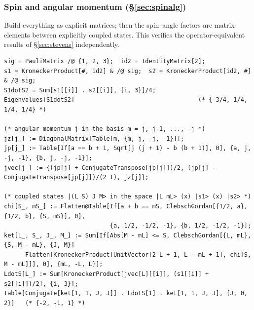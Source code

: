 \documentclass[11pt,a4paper]{article}
\numberwithin{equation}{section}
\theoremstyle{definition}
\theoremstyle{plain}
\theoremstyle{remark}
\numberwithin{algorithm}{section}
\begin{document}
\subsubsection{Spin and angular momentum (\S\ref{sec:spinalg})}\label{sec:mma-spin}
Build everything as explicit matrices; then the spin--angle factors are matrix elements between explicitly coupled states. This verifies the operator-equivalent results of \S\ref{sec:stevens} independently.
\begin{lstlisting}[style=wl]
sig = PauliMatrix /@ {1, 2, 3};  id2 = IdentityMatrix[2];
s1 = KroneckerProduct[#, id2] & /@ sig;  s2 = KroneckerProduct[id2, #] & /@ sig;
S1dotS2 = Sum[s1[[i]] . s2[[i]], {i, 3}]/4;
Eigenvalues[S1dotS2]                                   (* {-3/4, 1/4, 1/4, 1/4} *)

(* angular momentum j in the basis m = j, j-1, ..., -j *)
jz[j_] := DiagonalMatrix[Table[m, {m, j, -j, -1}]];
jp[j_] := Table[If[a == b + 1, Sqrt[j (j + 1) - b (b + 1)], 0], {a, j, -j, -1}, {b, j, -j, -1}];
jvec[j_] := {(jp[j] + ConjugateTranspose[jp[j]])/2, (jp[j] - ConjugateTranspose[jp[j]])/(2 I), jz[j]};

(* coupled states |(L S) J M> in the space |L mL> (x) |s1> (x) |s2> *)
chi[S_, mS_] := Flatten@Table[If[a + b == mS, ClebschGordan[{1/2, a}, {1/2, b}, {S, mS}], 0],
                              {a, 1/2, -1/2, -1}, {b, 1/2, -1/2, -1}];
ket[L_, S_, J_, M_] := Sum[If[Abs[M - mL] <= S, ClebschGordan[{L, mL}, {S, M - mL}, {J, M}]
      Flatten[KroneckerProduct[UnitVector[2 L + 1, L - mL + 1], chi[S, M - mL]]], 0], {mL, -L, L}];
LdotS[L_] := Sum[KroneckerProduct[jvec[L][[i]], (s1[[i]] + s2[[i]])/2], {i, 3}];
Table[Conjugate[ket[1, 1, J, J]] . LdotS[1] . ket[1, 1, J, J], {J, 0, 2}]   (* {-2, -1, 1} *)
\end{lstlisting}
\end{document}
